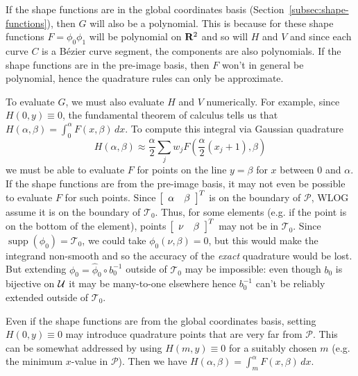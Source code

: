 If the shape functions are in the global coordinates basis
(Section~\ref{subsec:shape-functions}), then \(G\) will also be a polynomial.
This is because for these shape functions \(F = \phi_0 \phi_1\) will be
polynomial on \(\mathbf{R}^2\) and so will \(H\) and \(V\) and since each curve
\(C\) is a B\'{e}zier curve segment, the components are also polynomials.
If the shape functions are in the pre-image basis, then \(F\) won't in general
be polynomial, hence the quadrature rules can only be approximate.

To evaluate \(G\), we must also evaluate \(H\) and \(V\) numerically.
For example, since \(H(0, y) \equiv 0\),
the fundamental theorem of calculus tells us that
\(H\left(\alpha, \beta\right) = \int_0^{\alpha} F\left(x, \beta\right) \, dx\).
To compute this integral via Gaussian quadrature
\begin{equation}
H\left(\alpha, \beta\right) \approx \frac{\alpha}{2} \sum_j w_j
  F\left(\frac{\alpha}{2} (x_j + 1), \beta\right)
\end{equation}
we must be able to evaluate \(F\) for
points on the line \(y = \beta\) for \(x\) between \(0\) and \(\alpha\). If
the shape functions are from the pre-image basis, it may not even be possible
to evaluate \(F\) for such points. Since \(\left[\begin{array}{c c} \alpha &
\beta \end{array}\right]^T\) is on the boundary of \(\mathcal{P}\), WLOG
assume it is on the boundary of \(\mathcal{T}_0\). Thus, for some elements
(e.g. if the point is on the bottom of the element), points
\(\left[\begin{array}{c c} \nu & \beta \end{array}\right]^T\) may not be
in \(\mathcal{T}_0\). Since \(\operatorname{supp}(\phi_0) = \mathcal{T}_0\),
we could take \(\phi_0(\nu, \beta) = 0\), but this would make the integrand
non-smooth and so the accuracy of the \textit{exact} quadrature would be
lost. But extending \(\phi_0 = \widehat{\phi}_0 \circ b_0^{-1}\) outside
of \(\mathcal{T}_0\) may be impossible: even though \(b_0\) is bijective on
\(\mathcal{U}\) it may be many-to-one elsewhere hence \(b_0^{-1}\) can't be
reliably extended outside of \(\mathcal{T}_0\).

Even if the shape functions are from the global coordinates basis,
setting \(H(0, y) \equiv 0\) may introduce quadrature points that
are very far from \(\mathcal{P}\). This can be somewhat addressed by using
\(H(m, y) \equiv 0\) for a suitably chosen \(m\) (e.g. the minimum
\(x\)-value in \(\mathcal{P}\)). Then we have
\(H\left(\alpha, \beta\right) = \int_m^{\alpha} F\left(x, \beta\right) \, dx\).
